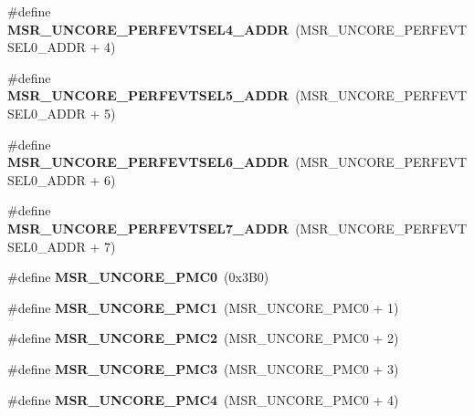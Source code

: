 \begin{DoxyCompactItemize}
\item 
\#define {\bfseries M\+S\+R\+\_\+\+U\+N\+C\+O\+R\+E\+\_\+\+P\+E\+R\+F\+E\+V\+T\+S\+E\+L4\+\_\+\+A\+D\+D\+R}~(M\+S\+R\+\_\+\+U\+N\+C\+O\+R\+E\+\_\+\+P\+E\+R\+F\+E\+V\+T\+S\+E\+L0\+\_\+\+A\+D\+D\+R + 4)\label{types_8h_a010d49776b25ca977779192d242b9967}

\item 
\#define {\bfseries M\+S\+R\+\_\+\+U\+N\+C\+O\+R\+E\+\_\+\+P\+E\+R\+F\+E\+V\+T\+S\+E\+L5\+\_\+\+A\+D\+D\+R}~(M\+S\+R\+\_\+\+U\+N\+C\+O\+R\+E\+\_\+\+P\+E\+R\+F\+E\+V\+T\+S\+E\+L0\+\_\+\+A\+D\+D\+R + 5)\label{types_8h_a3f2bdd1896753976342846df2df2b67b}

\item 
\#define {\bfseries M\+S\+R\+\_\+\+U\+N\+C\+O\+R\+E\+\_\+\+P\+E\+R\+F\+E\+V\+T\+S\+E\+L6\+\_\+\+A\+D\+D\+R}~(M\+S\+R\+\_\+\+U\+N\+C\+O\+R\+E\+\_\+\+P\+E\+R\+F\+E\+V\+T\+S\+E\+L0\+\_\+\+A\+D\+D\+R + 6)\label{types_8h_ae6571d558e765af67f21ce688a5530e9}

\item 
\#define {\bfseries M\+S\+R\+\_\+\+U\+N\+C\+O\+R\+E\+\_\+\+P\+E\+R\+F\+E\+V\+T\+S\+E\+L7\+\_\+\+A\+D\+D\+R}~(M\+S\+R\+\_\+\+U\+N\+C\+O\+R\+E\+\_\+\+P\+E\+R\+F\+E\+V\+T\+S\+E\+L0\+\_\+\+A\+D\+D\+R + 7)\label{types_8h_aeda0600911ff4baeeaeeb3c36540a508}

\item 
\#define {\bfseries M\+S\+R\+\_\+\+U\+N\+C\+O\+R\+E\+\_\+\+P\+M\+C0}~(0x3\+B0)\label{types_8h_a592a3e5afd79812513acf908d7ae0d8a}

\item 
\#define {\bfseries M\+S\+R\+\_\+\+U\+N\+C\+O\+R\+E\+\_\+\+P\+M\+C1}~(M\+S\+R\+\_\+\+U\+N\+C\+O\+R\+E\+\_\+\+P\+M\+C0 + 1)\label{types_8h_a717e98a8854f396ed8babb52ed62b94c}

\item 
\#define {\bfseries M\+S\+R\+\_\+\+U\+N\+C\+O\+R\+E\+\_\+\+P\+M\+C2}~(M\+S\+R\+\_\+\+U\+N\+C\+O\+R\+E\+\_\+\+P\+M\+C0 + 2)\label{types_8h_aca5d029ab6db9be41c3c2f8b87dd2349}

\item 
\#define {\bfseries M\+S\+R\+\_\+\+U\+N\+C\+O\+R\+E\+\_\+\+P\+M\+C3}~(M\+S\+R\+\_\+\+U\+N\+C\+O\+R\+E\+\_\+\+P\+M\+C0 + 3)\label{types_8h_aa24f97a63a98e8c679d63337b7d1f189}

\item 
\#define {\bfseries M\+S\+R\+\_\+\+U\+N\+C\+O\+R\+E\+\_\+\+P\+M\+C4}~(M\+S\+R\+\_\+\+U\+N\+C\+O\+R\+E\+\_\+\+P\+M\+C0 + 4)\label{types_8h_aa8da504c3306853bbc38d19b192bd871}


\end{DoxyCompactItemize}
